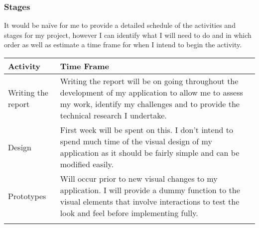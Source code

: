\subsubsection{Stages}\label{stages}

It would be naïve for me to provide a detailed schedule of the
activities and stages for my project, however I can identify what I will
need to do and in which order as well as estimate a time frame for when
I intend to begin the activity.

\begin{longtable}[]{@{}ll@{}}
\toprule
\begin{minipage}[b]{0.20\columnwidth}\raggedright\strut
Activity\strut
\end{minipage} & \begin{minipage}[b]{0.74\columnwidth}\raggedright\strut
Time Frame\strut
\end{minipage}\tabularnewline
\midrule
\endhead
\begin{minipage}[t]{0.20\columnwidth}\raggedright\strut
Writing the report\strut
\end{minipage} & \begin{minipage}[t]{0.74\columnwidth}\raggedright\strut
Writing the report will be on going throughout the development of my
application to allow me to assess my work, identify my challenges and to
provide the technical research I undertake.\strut
\end{minipage}\tabularnewline
\begin{minipage}[t]{0.20\columnwidth}\raggedright\strut
Design\strut
\end{minipage} & \begin{minipage}[t]{0.74\columnwidth}\raggedright\strut
First week will be spent on this. I don't intend to spend much time of
the visual design of my application as it should be fairly simple and
can be modified easily.\strut
\end{minipage}\tabularnewline
\begin{minipage}[t]{0.20\columnwidth}\raggedright\strut
Prototypes\strut
\end{minipage} & \begin{minipage}[t]{0.74\columnwidth}\raggedright\strut
Will occur prior to new visual changes to my application. I will provide
a dummy function to the visual elements that involve interactions to
test the look and feel before implementing fully.\strut
\end{minipage}\tabularnewline
\begin{minipage}[t]{0.20\columnwidth}\raggedright\strut

\end{minipage}
\end{longtable}

